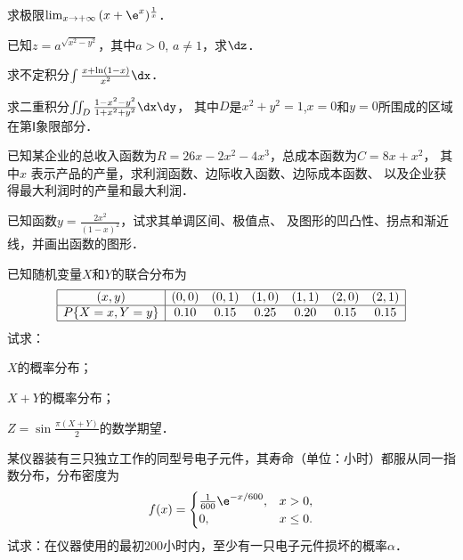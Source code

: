 \documentclass[plain,noanswer,medmath]{../../template/jnuexam}
\begin{document}
\begin{problem}
求极限$\lim_{x\to +\infty}\,(x+\e^x)^{\frac{1}{x}}$．
\end{problem}


\begin{problem}
已知$z=a^{\sqrt{x^2-y^2}}$，其中$a>0$, $a\ne 1$，求$\dz$．
\end{problem}


\begin{problem}
求不定积分$\int\frac{x+\ln(1-x)}{x^2}\dx$．
\end{problem}


\begin{problem}
求二重积分$\iint_D \frac{1-x^2-y^2}{1+x^2+y^2}\dx\dy$，
其中$D$是$x^2+y^2=1$,$x=0$和$y=0$所围成的区域在第Ⅰ象限部分．
\end{problem}



\begin{problem}
已知某企业的总收入函数为$R=26x-2x^2-4x^3$，总成本函数为$C=8x+ x^2$，
其中$x$ 表示产品的产量，求利润函数、边际收入函数、边际成本函数、
以及企业获得最大利润时的产量和最大利润．
\end{problem}



\begin{problem}
已知函数$y=\frac{2x^2}{(1-x)^2}$，试求其单调区间、极值点、
及图形的凹凸性、拐点和渐近线，并画出函数的图形．
\end{problem}











\begin{problem}
已知随机变量$X$和$Y$的联合分布为
$$\begin{array}{|c|cccccc|}
\hline
         (x,y) & (0,0) & (0,1) & (1,0) & (1,1) & (2,0) & (2,1) \\
\hline
  P\{X=x,Y=y\} &  0.10 &  0.15 &  0.25 &  0.20 &  0.15 & 0.15 \\
\hline
\end{array}$$
试求：\par
\begin{enumerate*}
\item $X$的概率分布；
\item $X+Y$的概率分布；
\item $Z=\sin\frac{\pi(X+Y)}{2}$的数学期望．
\end{enumerate*}
\end{problem}


\begin{problem}
某仪器装有三只独立工作的同型号电子元件，其寿命（单位：小时）都服从同一指数分布，分布密度为
$$f(x)=\begin{cases}
 \tfrac{1}{600}\e^{-x/600}, & x>0, \\
 0, & x\le 0. \\
\end{cases}$$
试求：在仪器使用的最初$200$小时内，至少有一只电子元件损坏的概率$\alpha$．
\end{problem}
\end{document}
